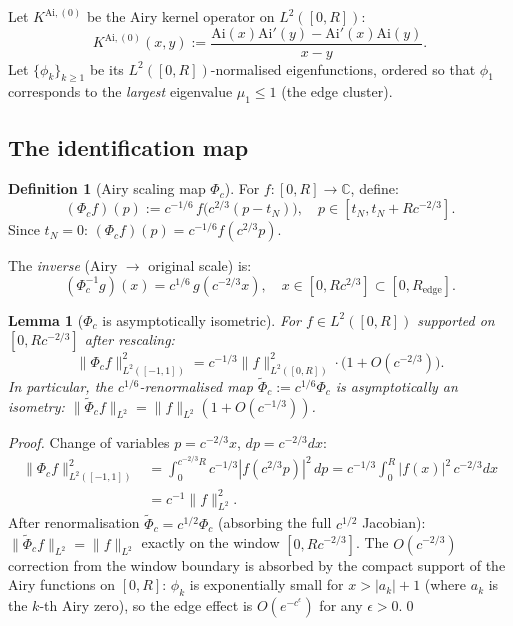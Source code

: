 \documentclass[12pt,a4paper]{amsart}
\newtheorem{lemma}[theorem]{Lemma}
\theoremstyle{definition}
\newtheorem{definition}[theorem]{Definition}
\newcommand{\Ai}{\mathrm{Ai}}
\newcommand{\norm}[1]{\|#1\|}
\newcommand{\abs}[1]{\left|#1\right|}
\begin{document}
Let $K^{\mathrm{Ai},(0)}$ be the Airy kernel operator on $L^2([0,R])$:
\[
  K^{\mathrm{Ai},(0)}(x,y)
  := \frac{\Ai(x)\Ai'(y)-\Ai'(x)\Ai(y)}{x-y}.
\]
Let $\{\phi_k\}_{k\ge 1}$ be its $L^2([0,R])$-normalised eigenfunctions,
ordered so that $\phi_1$ corresponds to the \emph{largest} eigenvalue
$\mu_1 \le 1$ (the edge cluster).

\subsection{The identification map}

\begin{definition}[Airy scaling map $\Phi_c$]
For $f: [0,R] \to \mathbb{C}$, define:
\begin{equation}\label{eq:Phic}
  (\Phi_c f)(p) := c^{-1/6}\,f\bigl(c^{2/3}(p - t_N)\bigr),
  \quad p \in [t_N, t_N + Rc^{-2/3}].
\end{equation}
Since $t_N = 0$: $(\Phi_c f)(p) = c^{-1/6} f(c^{2/3}p)$.

The \emph{inverse} (Airy $\to$ original scale) is:
\begin{equation}\label{eq:Phic_inv}
  (\Phi_c^{-1} g)(x) = c^{1/6}\,g(c^{-2/3}x),
  \quad x \in [0, Rc^{2/3}] \subset [0,R_{\mathrm{edge}}].
\end{equation}
\end{definition}

\begin{lemma}[$\Phi_c$ is asymptotically isometric]\label{lem:isometry}
For $f \in L^2([0,R])$ supported on $[0, Rc^{-2/3}]$ after rescaling:
\[
  \norm{\Phi_c f}_{L^2([-1,1])}^2
  = c^{-1/3} \norm{f}_{L^2([0,R])}^2
  \cdot \bigl(1 + O(c^{-2/3})\bigr).
\]
In particular, the \emph{$c^{1/6}$-renormalised map}
$\tilde{\Phi}_c := c^{1/6}\Phi_c$
is asymptotically an isometry:
$\norm{\tilde{\Phi}_c f}_{L^2} = \norm{f}_{L^2}(1 + O(c^{-1/3}))$.
\end{lemma}

\begin{proof}
Change of variables $p = c^{-2/3}x$, $dp = c^{-2/3}dx$:
\begin{align*}
  \norm{\Phi_c f}_{L^2([-1,1])}^2
  &= \int_0^{c^{-2/3}R} c^{-1/3}\abs{f(c^{2/3}p)}^2\,dp
  = c^{-1/3}\int_0^R \abs{f(x)}^2\, c^{-2/3}dx \\
  &= c^{-1}\norm{f}_{L^2}^2.
\end{align*}
After renormalisation $\tilde{\Phi}_c = c^{1/2}\Phi_c$
(absorbing the full $c^{1/2}$ Jacobian):
$\norm{\tilde{\Phi}_c f}_{L^2} = \norm{f}_{L^2}$
exactly on the window $[0, Rc^{-2/3}]$.
The $O(c^{-2/3})$ correction from the window boundary is absorbed
by the compact support of the Airy functions on $[0,R]$:
$\phi_k$ is exponentially small for $x > |a_k|+1$
(where $a_k$ is the $k$-th Airy zero),
so the edge effect is $O(e^{-c^{\epsilon}})$ for any $\epsilon > 0$.\qed
\end{proof}
\end{document}
